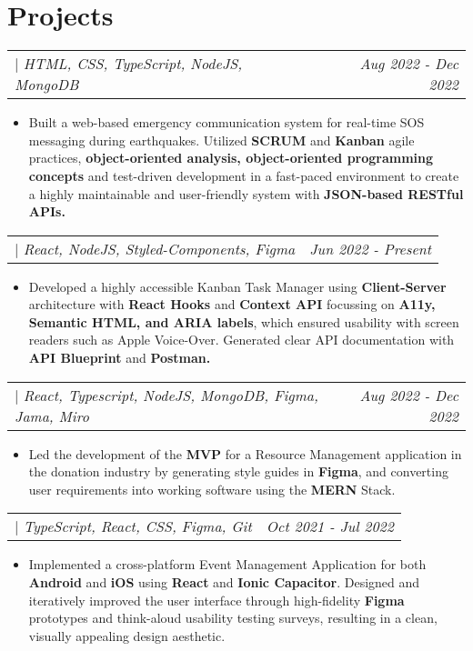 \documentclass[letterpaper]{article}
\makeatletter
\newcommand{\resumeItemWithoutTitle}[1]{
  \item\small{
    {#1 \vspace{-2pt}}
  }
}
\newcommand{\shortSection}[1]{
    \vspace{-6pt}
    \section{#1}
}
\newcommand{\projectHeading}[3]{
  \begin{tabular*}{\textwidth}{l@{\extracolsep{\fill}}r}
        \textbf{#1} 
        \hspace{-2pt} $\vert$ \hspace{-2pt} \small{\textit{#2}} 
        & 
        \textit{#3} \\
    \end{tabular*}\vspace{-2pt}
}
\newcommand{\resumeItemListStart}{\begin{itemize}}
\newcommand{\resumeItemListEnd}{\end{itemize}}
\makeatother
\begin{document}



\shortSection{Projects}
\vspace{3pt}
\projectHeading {\href{https://esn.onrender.com}{\color{blue}{Emergency Social Network}}}{HTML, CSS, TypeScript, NodeJS, MongoDB}{Aug 2022 - Dec 2022}
\resumeItemListStart
\resumeItemWithoutTitle{Built a web-based emergency communication system for real-time SOS messaging during earthquakes. Utilized \textbf{SCRUM} and \textbf{Kanban} agile practices, \textbf{object-oriented analysis, object-oriented programming concepts} and test-driven development in a fast-paced environment to create a highly maintainable and user-friendly system with \textbf{JSON-based RESTful APIs.}}
\resumeItemListEnd


\projectHeading {\href{https://kanbhan.netlify.app}{\color{blue}{Kanban Task Manager}}}{React, NodeJS, Styled-Components, Figma}{Jun 2022 - Present}
\resumeItemListStart
\resumeItemWithoutTitle{Developed a highly accessible Kanban Task Manager using \textbf{Client-Server} architecture with \textbf{React Hooks} and \textbf{Context API} focussing on \textbf{A11y, Semantic HTML, and ARIA labels}, which ensured usability with screen readers such as Apple Voice-Over. Generated clear API documentation with \textbf{API Blueprint} and \textbf{Postman.}}
\resumeItemListEnd


\vspace{3pt}
\projectHeading {\href{https://mailchi.mp/6cf20f3d592f/reuse}{\color{blue}{Re:use}}}{React, Typescript, NodeJS, MongoDB, Figma, Jama, Miro}{Aug 2022 - Dec 2022}
\resumeItemListStart
\resumeItemWithoutTitle{Led the development of the \textbf{MVP} for a Resource Management application in the donation industry by generating style guides in \textbf{Figma}, and converting user requirements into working software using the \textbf{MERN} Stack.}
\resumeItemListEnd

\vspace{3pt}
\projectHeading {\href{https://www.figma.com/file/FpWVddCZKdJz5V7ADe4eb5/Refriendo}{\color{blue}{Refriendo}}}{TypeScript, React, CSS, Figma, Git}{Oct 2021 - Jul 2022}
\resumeItemListStart
\resumeItemWithoutTitle{Implemented a cross-platform Event Management Application for both \textbf{Android} and \textbf{iOS} using \textbf{React} and \textbf{Ionic Capacitor}. Designed and iteratively improved the user interface through high-fidelity \textbf{Figma} prototypes and think-aloud usability testing surveys, resulting in a clean, visually appealing design aesthetic.}
\resumeItemListEnd
\end{document}
